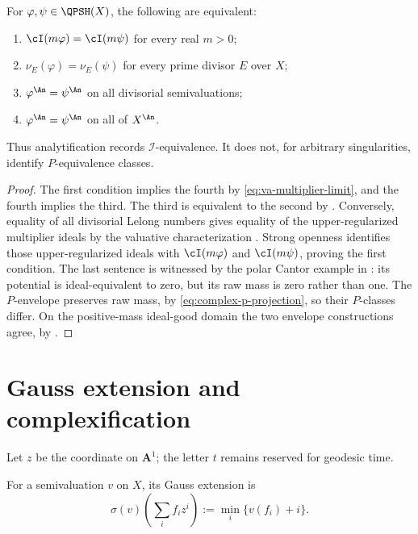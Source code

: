 \par\medskip\noindent\begin{minipage}{\linewidth}
\begin{proposition}
\label{prop:va-i-equivalence}
For $\varphi,\psi\in\QPSH(X)$, the following are equivalent:
\begin{enumerate}
\item $\cI(m\varphi)=\cI(m\psi)$ for every real $m>0$;
\item $\nu_E(\varphi)=\nu_E(\psi)$ for every prime divisor $E$ over
      $X$;
\item $\varphi^{\An}=\psi^{\An}$ on all divisorial semivaluations;
\item $\varphi^{\An}=\psi^{\An}$ on all of $X^{\An}$.
\end{enumerate}
Thus analytification records $\mathcal I$-equivalence.  It does not, for
arbitrary singularities, identify $P$-equivalence classes.
\end{proposition}
\end{minipage}\par\medskip

\begin{proof}
The first condition implies the fourth by
\eqref{eq:va-multiplier-limit}, and the fourth implies the third.
The third is equivalent to the second by
.  Conversely, equality of all divisorial
Lelong numbers gives equality of the upper-regularized multiplier ideals by
the valuative characterization \cite[Theorem~A]{BFJ08}.  Strong openness
\cite{GZ15} identifies those upper-regularized ideals with
$\cI(m\varphi)$ and $\cI(m\psi)$, proving the first condition.  The
last sentence is witnessed by the polar Cantor example in
: its potential is ideal-equivalent
to zero, but its raw mass is zero rather than one. The $P$-envelope
preserves raw mass, by \eqref{eq:complex-p-projection}, so their
$P$-classes differ. On the positive-mass ideal-good domain the two envelope
constructions agree, by \cite[Theorem~7.1.1]{XiaBook}.
\end{proof}

\section{Gauss extension and complexification}
\label{sec:va-gauss}

Let $z$ be the coordinate on $\mathbf A^1$; the letter $t$ remains
reserved for geodesic time.

\begin{definition}
\label{def:va-gauss-extension}
For a semivaluation $v$ on $X$, its Gauss extension is
\[
 \sigma(v)\!\left(\sum_i f_iz^i\right)
       :=\min_i\{v(f_i)+i\}.
\tag{56.6}\label{eq:va-gauss}
\]
\end{definition}

